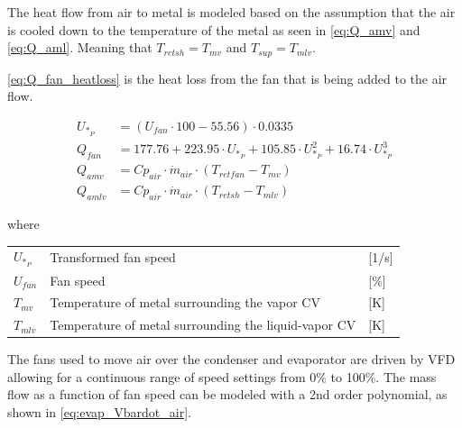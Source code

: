 \medskip
The heat flow from air to metal is modeled based on the assumption that the air is cooled down to the temperature of the metal as seen in \cref{eq:Q_amv} and \cref{eq:Q_aml}. Meaning that $T_{retsh} = T_{mv}$ and $T_{sup} = T_{mlv}$.

\cref{eq:Q_fan_heatloss} is the heat loss from the fan that is being added to the air flow. 

\begin{align}
	U_{*_P} & = \left( U_{fan}\cdot 100 - 55.56 \right) \cdot 0.0335                                         \\
	Q_{fan} & = 177.76 + 223.95 \cdot U_{*_P} + 105.85 \cdot U_{*_P}^2 + 16.74 \cdot U_{*_P}^3	\label{eq:Q_fan_heatloss} \\
	Q_{amv} & = Cp_{air} \cdot \dot{m}_{air} \cdot (T_{retfan} - T_{mv}) 	\label{eq:Q_amv}                                \\
	Q_{amlv} & = Cp_{air} \cdot \dot{m}_{air} \cdot (T_{retsh} - T_{mlv}) 	\label{eq:Q_aml}
\end{align}

where

\begin{center}
	\begin{tabular}{l p{10cm} l}
		$U_{*_P}$       & Transformed fan speed                                & [1/\si{s}]                        \\
		$U_{fan}$       & Fan speed                                            & [$\%$]                        \\
		$T_{mv}$        & Temperature of metal surrounding the vapor CV        & [\si{K}]                          \\
		$T_{mlv}$       & Temperature of metal surrounding the liquid-vapor CV & [\si{K}]
	\end{tabular}
\end{center}

The fans used to move air over the condenser and evaporator are driven by VFD allowing for a continuous range of speed settings from 0\% to 100\%. The mass flow as a function of fan speed can be modeled with a 2nd order polynomial, as shown in \cref{eq:evap_Vbardot_air}.

